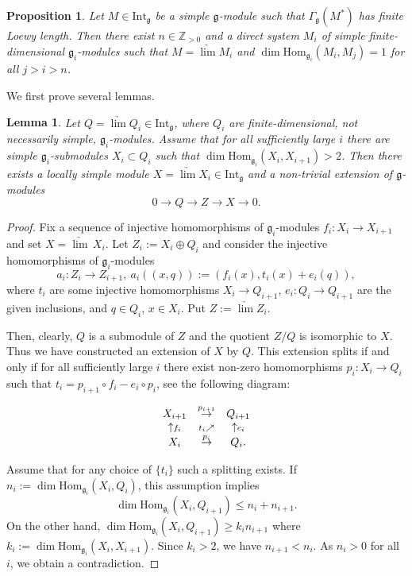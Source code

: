 \documentclass{birkmult}
\newcounter{theorem}
\newtheorem{lemma}[theo]{Lemma}
\newtheorem{prop}[theo]{Proposition}
\newcommand {\ZZ} {\mathbb {Z}}
\renewcommand{\gg}{\mathfrak{g}}
\newcommand{\ds}{\displaystyle}
\newcommand{\Int}{\mathrm{Int}}
\renewcommand{\hom}{\mathrm{Hom}}
\begin{document}
\begin{prop}\label{mult} Let $M\in\Int_{\gg}$ be a simple $\gg$-module such that $\Gamma_{\gg}(M^*)$
  has finite Loewy length. Then there exist $n\in\ZZ_{>0}$ and a direct system $M_i$ of
  simple finite-dimensional $\gg_i$-modules such that  $M=\underrightarrow{\lim} M_i$
  and $\dim\hom_{\gg_i} (M_i,M_{j})=1$ for
  all $j>i>n$.
\end{prop}
We first prove several lemmas.
\begin{lemma}\label{extension} Let $Q=\underrightarrow{\lim} Q_i\in\Int_\gg$, where $Q_i$ are finite-dimensional, not necessarily simple, $\gg_i$-modules. Assume that for all sufficiently
large $i$ there are simple $\gg_i$-submodules $X_i\subset Q_i$ such that
$\dim\hom_{\gg_i}(X_i,X_{i+1})>2$. Then there exists a locally simple
module $X=\underrightarrow{\lim} X_i\in\Int_{\gg}$ and a non-trivial extension of $\gg$-modules
$$0\to Q\to Z\to X\to 0.$$
\end{lemma}
\begin{proof} Fix a sequence of injective
homomorphisms of $\gg_i$-modules $f_i:X_i\to X_{i+1}$ and set
$X=\underrightarrow{\lim}\,X_i $. Let $Z_i:=X_i\oplus Q_i$ and
consider the injective homomorphisms of $\gg_i$-modules
$$\ds a_i:Z_i\to Z_{i+1},\ a_i((x, q)):=(f_i(x), t_i(x)+e_i(q)),$$
where $t_i$ are some injective homomorphisms $X_i{\to}Q_{i+1}$,
$e_i:Q_i\to Q_{i+1}$ are the given inclusions, and $q\in Q_i$,
$x\in X_i$. Put $\ds Z:=\underrightarrow{\lim} Z_i$.

Then, clearly, $Q$ is a submodule of $Z$ and the quotient $Z/Q$ is
isomorphic to $X$. Thus we have constructed an extension of $X$ by
$Q$. This extension splits if and only if for all sufficiently
large $i$ there exist non-zero homomorphisms $p_i:X_i\to Q_i$ such
that $t_i=p_{i+1}\circ f_i-e_i\circ p_i$, see the following diagram:

$$\begin{array}[c]{ccc}
X_{i+1}&\stackrel{p_{i+1}}{\rightarrow}&Q_{i+1}\\
\uparrow\scriptstyle{f_i}&\scriptstyle{t_i}\nearrow &\uparrow\scriptstyle{e_i}\\
X_{i}&\stackrel{p_i}{\rightarrow}&Q_{i}.
\end{array}$$

 Assume that for any
choice of $\{t_i\}$ such a splitting exists. If
$n_i:=\dim\hom_{\gg_i}(X_i,Q_i)$, this assumption implies
$$\dim \hom_{\gg_i}(X_i,Q_{i+1})\leq n_i+n_{i+1}.$$
On the other hand, $\dim \hom_{\gg_i}(X_i,Q_{i+1})\geq k_i
n_{i+1}$ where $k_i:=\dim\hom_{\gg_i}(X_i,X_{i+1})$. Since
$k_i>2$, we have $n_{i+1}< n_i$.  As $n_i>0$ for all $i$, we
obtain a contradiction.
\end{proof}
\end{document}
